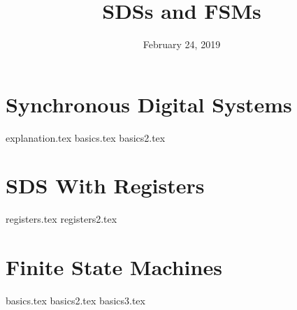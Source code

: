\documentclass[11pt]{exam}
\title{SDSs and FSMs}
\date{February 24, 2019}
\begin{document}
\maketitle

\section{Synchronous Digital Systems}
\begin{questions}
{explanation.tex}
{basics.tex}
{basics2.tex}
\end{questions}
\newpage

\section{SDS With Registers}
\begin{questions}
{registers.tex}
{registers2.tex}
\end{questions}
\newpage

\section{Finite State Machines}
\begin{questions}
{basics.tex}
{basics2.tex}
{basics3.tex}
\end{questions}
\end{document}
